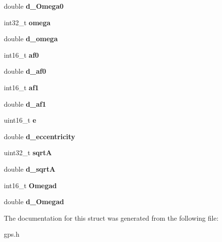 \begin{DoxyCompactItemize}
\item 
\hypertarget{structalmanac__t_a2089077a56d020ece59b505ca8a7bcc6}{double {\bfseries d\-\_\-\-Omega0}}\label{structalmanac__t_a2089077a56d020ece59b505ca8a7bcc6}

\item 
\hypertarget{structalmanac__t_a147de972a0ea5b863fcdf2486210514c}{int32\-\_\-t {\bfseries omega}}\label{structalmanac__t_a147de972a0ea5b863fcdf2486210514c}

\item 
\hypertarget{structalmanac__t_a1ef7b6c41201340609cd91f9136b0efe}{double {\bfseries d\-\_\-omega}}\label{structalmanac__t_a1ef7b6c41201340609cd91f9136b0efe}

\item 
\hypertarget{structalmanac__t_a370fe1571faf126f36fefde93f341df3}{int16\-\_\-t {\bfseries af0}}\label{structalmanac__t_a370fe1571faf126f36fefde93f341df3}

\item 
\hypertarget{structalmanac__t_a32beb8ec1a0196020ef0a89d67288af6}{double {\bfseries d\-\_\-af0}}\label{structalmanac__t_a32beb8ec1a0196020ef0a89d67288af6}

\item 
\hypertarget{structalmanac__t_ae32422552973401a6df788dd2dbb5bae}{int16\-\_\-t {\bfseries af1}}\label{structalmanac__t_ae32422552973401a6df788dd2dbb5bae}

\item 
\hypertarget{structalmanac__t_a0420c5a9cdfa8750903a5bfa6d9f1721}{double {\bfseries d\-\_\-af1}}\label{structalmanac__t_a0420c5a9cdfa8750903a5bfa6d9f1721}

\item 
\hypertarget{structalmanac__t_a13ac39436fb6667a09107ed8ba5ae0d5}{uint16\-\_\-t {\bfseries e}}\label{structalmanac__t_a13ac39436fb6667a09107ed8ba5ae0d5}

\item 
\hypertarget{structalmanac__t_ae4a3c83ce0ccdc68bea0c5f08a8fe3fc}{double {\bfseries d\-\_\-eccentricity}}\label{structalmanac__t_ae4a3c83ce0ccdc68bea0c5f08a8fe3fc}

\item 
\hypertarget{structalmanac__t_a4e99186a4287f06eafc98f7012aa1b43}{uint32\-\_\-t {\bfseries sqrt\-A}}\label{structalmanac__t_a4e99186a4287f06eafc98f7012aa1b43}

\item 
\hypertarget{structalmanac__t_ab0df8499d755ebe7f8982677371a2692}{double {\bfseries d\-\_\-sqrt\-A}}\label{structalmanac__t_ab0df8499d755ebe7f8982677371a2692}

\item 
\hypertarget{structalmanac__t_a5075bd3b5dac3469e9efcbbf8b9a182a}{int16\-\_\-t {\bfseries \-Omegad}}\label{structalmanac__t_a5075bd3b5dac3469e9efcbbf8b9a182a}

\item 
\hypertarget{structalmanac__t_a43735d662b1e85c75fa1a80da77cfcbd}{double {\bfseries d\-\_\-\-Omegad}}\label{structalmanac__t_a43735d662b1e85c75fa1a80da77cfcbd}

\end{DoxyCompactItemize}


\-The documentation for this struct was generated from the following file\-:\begin{DoxyCompactItemize}
\item 
gps.\-h\end{DoxyCompactItemize}

